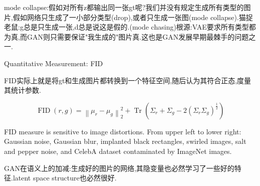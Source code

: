 	mode collapse:假如对所有z都输出同一张gt呢?我们并没有规定生成所有类型的图片,假如网络只生成了一小部分类型(drop),或者只生成一张图(mode collapse).猫捉老鼠:g总是只生成一张,d总是说这是假的.(mode chasing)根源:VAE要求所有类型都为真,而GAN则只需要保证"我生成的"图片真.这也是GAN发展早期最棘手的问题之一.
	
	Quantitative Measurement: FID
	
	FID实际上就是将gt和生成图片都转换到一个特征空间,随后认为其符合正态,度量其统计参数.
	
	\begin{equation}
		\operatorname{FID}(r, g)=\left\|\mu_{r}-\mu_{g}\right\|_{2}^{2}+\operatorname{Tr}\left(\Sigma_{r}+\Sigma_{g}-2\left(\Sigma_{r} \Sigma_{g}\right)^{\frac{1}{2}}\right)
	\end{equation}
	
	FID measure is sensitive to image distortions. From upper left to lower right: Gaussian noise, Gaussian blur, implanted black rectangles, swirled images, salt and pepper noise, and CelebA dataset contaminated by ImageNet images.
	
	GAN在语义上的加减:生成好的图片的网络,其隐变量也必然学习了一些好的特征.latent space structure也必然很好.
	
	
